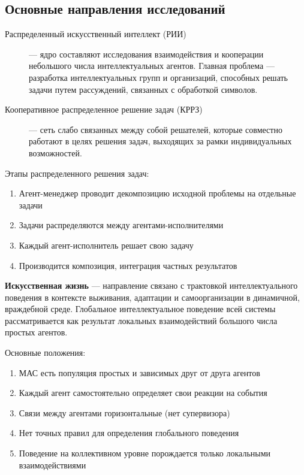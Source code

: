 \subsection{Основные направления исследований}

\begin{description}
  \item[Распределенный искусственный интеллект (РИИ)] — ядро составляют исследования взаимодействия и кооперации небольшого числа интеллектуальных агентов. Главная проблема — разработка интеллектуальных групп и организаций, способных решать задачи путем рассуждений, связанных с обработкой символов.
  \item[Кооперативное распределенное решение задач (КРРЗ)] — сеть слабо связанных между собой решателей, которые совместно работают в целях решения задач, выходящих за рамки индивидуальных возможностей.
\end{description}

Этапы распределенного решения задач:

\begin{enumerate}
  \item Агент-менеджер проводит декомпозицию исходной проблемы на отдельные задачи
  \item Задачи распределяются между агентами-исполнителями
  \item Каждый агент-исполнитель решает свою задачу
  \item Производится композиция, интеграция частных результатов
\end{enumerate}

\textbf{Искусственная жизнь} — направление связано с трактовкой интеллектуального поведения в контексте выживания, адаптации и самоорганизации в динамичной, враждебной среде. Глобальное интеллектуальное поведение всей системы рассматривается как результат локальных взаимодействий большого числа простых агентов.

Основные положения:

\begin{enumerate}
  \item МАС есть популяция простых и зависимых друг от друга агентов
  \item Каждый агент самостоятельно определяет свои реакции на события
  \item Связи между агентами горизонтальные (нет супервизора)
  \item Нет точных правил для определения глобального поведения
  \item Поведение на коллективном уровне порождается только локальными взаимодействиями
\end{enumerate}

